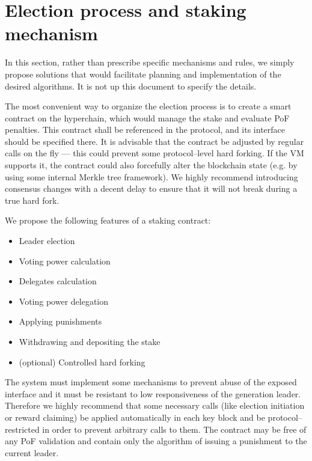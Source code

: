 \section{Election process and staking mechanism}
In this section, rather than prescribe specific mechanisms and rules,
we simply propose solutions that would facilitate planning and implementation
of the desired algorithms. It is not up this document to specify the details.

The most convenient way to organize the election process is to create a smart
contract on the hyperchain, which would manage the stake and evaluate PoF
penalties. This contract shall be referenced in the protocol, and its interface
should be specified there. It is advisable that the contract be adjusted by
regular calls on the fly
— this could prevent some protocol–level hard forking. If the VM supports it, the
contract could also forcefully alter the blockchain state (e.g. by using some
internal Merkle tree framework). We highly recommend introducing consensus
changes with a decent delay to ensure that it will not break during a true hard fork.

We propose the following features of a staking contract:
\begin{itemize}
\item Leader election
\item Voting power calculation
\item Delegates calculation
\item Voting power delegation
\item Applying punishments
\item Withdrawing and depositing the stake
\item (optional) Controlled hard forking
\end{itemize}

The system must implement some mechanisms to prevent abuse of the exposed
interface and it must be resistant to low responsiveness
of the generation leader. Therefore we highly recommend that some necessary
calls (like election initiation or reward claiming) be applied automatically
in each key block and be protocol–restricted in order to prevent
arbitrary calls to them. The contract may be free of any PoF validation and
contain only the algorithm of issuing a punishment to the current leader.
